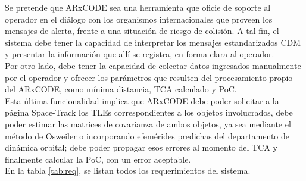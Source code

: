 Se pretende que ARxCODE sea una herramienta que oficie de soporte al operador en el di\'alogo con los organismos internacionales que proveen los mensajes de alerta, frente a una situaci\'on de riesgo de colisi\'on. A tal fin, el sistema debe tener la capacidad de interpretar los mensajes estandarizados CDM y presentar la informaci\'on que all\'i se registra, en forma clara al operador.\\
Por otro lado, debe tener la capacidad de colectar datos ingresados manualmente por el operador y ofrecer los par\'ametros que resulten del procesamiento propio del ARxCODE, como m\'inima distancia, TCA calculado y PoC.\\
Esta \'ultima funcionalidad implica que ARxCODE debe poder solicitar a la p\'agina Space-Track los TLEs correspondientes a los objetos involucrados, debe poder estimar las matrices de covarianza de ambos objetos, ya sea mediante el m\'etodo de Osweiler o incorporando efem\'erides predichas del departamento de din\'amica orbital; debe poder propagar esos errores al momento del TCA y finalmente calcular la PoC, con un error aceptable.\\
En la tabla \ref{tab:req}, se listan todos los requerimientos del sistema.\\


